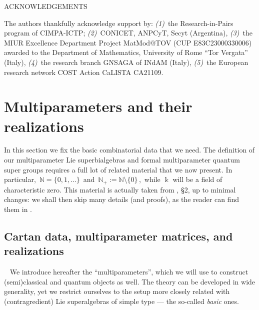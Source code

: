 \documentclass[12pt,reqno,twoside,a4paper]{amsart}
\numberwithin{equation}{section}
\theoremstyle{definition}
\newtheorem{free text}[lema]{}
\theoremstyle{remark}
\def \NN{\mathbb{N}}
\def \k {\Bbbk}
\theoremstyle{plain}
\begin{document}
\vskip11pt

   \centerline{\ssmallrm ACKNOWLEDGEMENTS}
%
 \vskip3pt
%
   {\smallrm The authors thankfully acknowledge support by:
   \;\textit{(1)}\,  the  {\smallsl Research-in-Pairs\/}  program of  {\smallsl CIMPA-ICTP\/};
   \;\textit{(2)}\,  CONICET, ANPCyT, Secyt (Argentina),
   \;\textit{(3)}\,  the MIUR  {\smallsl Excellence Department Project
   MatMod@TOV (CUP E83C23000330006)\/}  awarded to the Department of Mathematics,
   University of Rome ``Tor Vergata'' (Italy),
   \;\textit{(4)}\,  the research branch  {\smallsl GNSAGA\/}  of INdAM (Italy),
   \;\textit{(5)}\,  the European research network  {\smallsl COST Action CaLISTA CA21109}.}

\bigskip
 \medskip


\section{Multiparameters and their realizations}  \label{sec: Cartan-data_realiz's}
%
 \vskip7pt
%
   In this section we fix the basic combinatorial data that we need.  The definition of our multiparameter Lie superbialgebras and formal multiparameter quantum super groups requires a full lot of related material that we now present.  In particular,  $ \, \NN = \{0, 1,\ldots\} \, $  and  $ \, \NN_+ := \NN \setminus \{0\} \, $,
   \,while  $ \k $  will be a field of characteristic zero.  This material is actually taken from  \cite{GG3}, \S 2,  up to minimal changes: we shall then skip many details (and proofs), as the reader can find them in  \cite{GG3}.

\medskip

\subsection{Cartan data, multiparameter matrices, and realizations}
%
  \label{MpMatrices, Cartan & realiz.'s}  {\ }
%
 \vskip7pt
%
   We introduce hereafter the ``multiparameters'', which we will use to construct (semi)classical and quantum objects as well.  The theory can be developed in wide generality, yet we restrict ourselves to the setup more closely related with (contragredient) Lie superalgebras of simple type   --- the so-called  \textit{basic\/}  ones.
\end{document}
